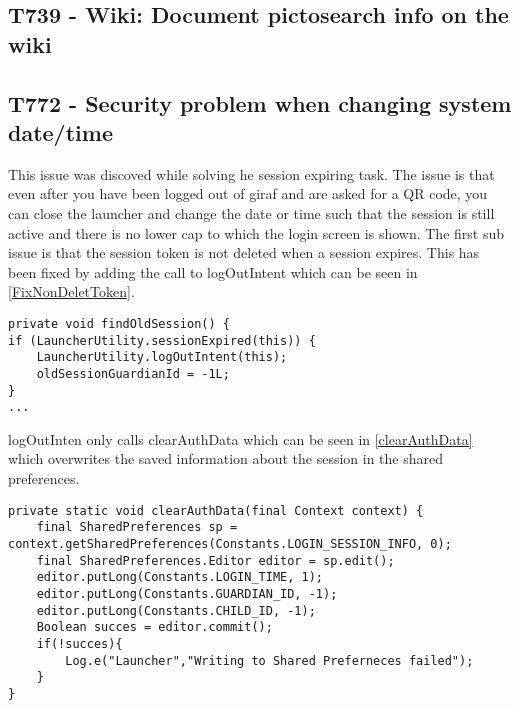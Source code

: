 \subsection{T739 - Wiki: Document pictosearch info on the wiki}

\subsection{T772 - Security problem when changing system date/time}\label{T772}
This issue was discoved while solving he session expiring task. The issue is
that even after you have been logged out of giraf and are asked for a QR code,
you can close the launcher and change the date or time such that the session is
still active and there is no lower cap to which the login screen is shown. The
first sub issue is that the session token is not deleted when a session expires.
This has been fixed by adding the call to logOutIntent which can be seen in
\autoref{FixNonDeletToken}.\nl

\begin{minipage}[H]{\linewidth}
\begin{lstlisting}[caption = Our solution to not clearing the token, label =
FixNonDeletToken] 
private void findOldSession() {
if (LauncherUtility.sessionExpired(this)) {
	LauncherUtility.logOutIntent(this);
    oldSessionGuardianId = -1L;
}
...
\end{lstlisting} 
\end{minipage}

logOutInten only calls clearAuthData which can be seen in
\autoref{clearAuthData} which overwrites the saved information about the
session in the shared preferences.\nl

\begin{minipage}[H]{\linewidth}
\begin{lstlisting}[caption = ClearAuthData methode, label = clearAuthData]
private static void clearAuthData(final Context context) {
    final SharedPreferences sp = context.getSharedPreferences(Constants.LOGIN_SESSION_INFO, 0);
    final SharedPreferences.Editor editor = sp.edit();
    editor.putLong(Constants.LOGIN_TIME, 1);
    editor.putLong(Constants.GUARDIAN_ID, -1);
    editor.putLong(Constants.CHILD_ID, -1);
    Boolean succes = editor.commit();
    if(!succes){
    	Log.e("Launcher","Writing to Shared Preferneces failed");
    }
}
\end{lstlisting} 
\end{minipage}

